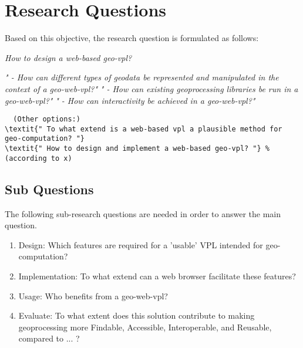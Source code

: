 
\section{Research Questions}
Based on this objective, the research question is formulated as follows: 


\textit{How to design a web-based geo-vpl?}

\textit{" - How can different types of geodata be represented and manipulated in the context of a geo-web-vpl?"}
\textit{" - How can existing geoprocessing libraries be run in a geo-web-vpl?"}
\textit{" - How can interactivity be achieved in a geo-web-vpl?"}


\begin{lstlisting}
  (Other options:)
\textit{" To what extend is a web-based vpl a plausible method for geo-computation? "} 
\textit{" How to design and implement a web-based geo-vpl? "} % (according to x)
\end{lstlisting}



\subsection*{Sub Questions}
The following sub-research questions are needed in order to answer the main question. 

\begin{enumerate}[a]
  \item Design: Which features are required for a 'usable' VPL intended for geo-computation? 
  \item Implementation: To what extend can a web browser facilitate these features?
  \item Usage: Who benefits from a geo-web-vpl? 
  \item Evaluate: To what extent does this solution contribute to making geoprocessing more Findable, Accessible, Interoperable, and Reusable, compared to ... ?  
\end{enumerate}

